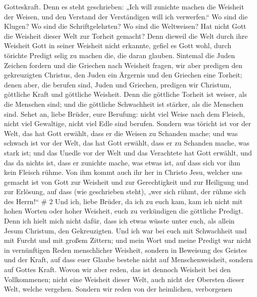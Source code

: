 Gotteskraft.  Denn es steht geschrieben: „Ich will zunichte
machen die Weisheit der Weisen, und den Verstand der Verständigen will
ich verwerfen.``  Wo sind die Klugen? Wo sind die
Schriftgelehrten? Wo sind die Weltweisen? Hat nicht Gott die Weisheit
dieser Welt zur Torheit gemacht?  Denn dieweil die Welt
durch ihre Weisheit Gott in seiner Weisheit nicht erkannte, gefiel es
Gott wohl, durch törichte Predigt selig zu machen die, die daran
glauben.  Sintemal die Juden Zeichen fordern und die
Griechen nach Weisheit fragen,  wir aber predigen den
gekreuzigten Christus, den Juden ein Ärgernis und den Griechen eine
Torheit;  denen aber, die berufen sind, Juden und Griechen,
predigen wir Christum, göttliche Kraft und göttliche Weisheit.
 Denn die göttliche Torheit ist weiser, als die Menschen
sind; und die göttliche Schwachheit ist stärker, als die Menschen sind.
 Sehet an, liebe Brüder, eure Berufung: nicht viel Weise
nach dem Fleisch, nicht viel Gewaltige, nicht viel Edle sind berufen.
 Sondern was töricht ist vor der Welt, das hat Gott
erwählt, dass er die Weisen zu Schanden mache; und was schwach ist vor
der Welt, das hat Gott erwählt, dass er zu Schanden mache, was stark
ist;  und das Unedle vor der Welt und das Verachtete hat
Gott erwählt, und das da nichts ist, dass er zunichte mache, was etwas
ist,  auf dass sich vor ihm kein Fleisch rühme.
 Von ihm kommt auch ihr her in Christo Jesu, welcher uns
gemacht ist von Gott zur Weisheit und zur Gerechtigkeit und zur
Heiligung und zur Erlösung,  auf dass (wie geschrieben
steht), „wer sich rühmt, der rühme sich des Herrn!{}`` \# 2 
Und ich, liebe Brüder, da ich zu euch kam, kam ich nicht mit hohen
Worten oder hoher Weisheit, euch zu verkündigen die göttliche Predigt.
 Denn ich hielt mich nicht dafür, dass ich etwas wüsste
unter euch, als allein Jesum Christum, den Gekreuzigten. 
Und ich war bei euch mit Schwachheit und mit Furcht und mit großem
Zittern;  und mein Wort und meine Predigt war nicht in
vernünftigen Reden menschlicher Weisheit, sondern in Beweisung des
Geistes und der Kraft,  auf dass euer Glaube bestehe nicht
auf Menschenweisheit, sondern auf Gottes Kraft.  Wovon wir
aber reden, das ist dennoch Weisheit bei den Vollkommenen; nicht eine
Weisheit dieser Welt, auch nicht der Obersten dieser Welt, welche
vergehen.  Sondern wir reden von der heimlichen, verborgenen
